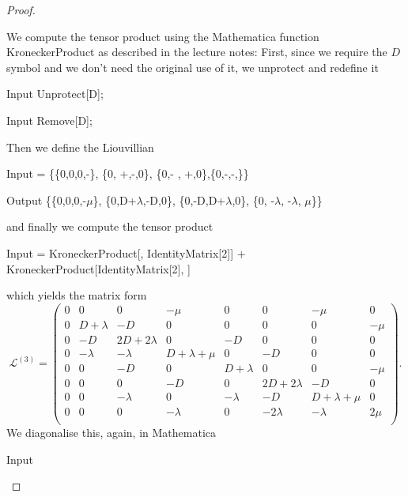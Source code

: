\begin{proof}
\begin{parts}
	We compute the tensor product using the Mathematica function KroneckerProduct as described in the lecture notes: First, since we require the $D$ symbol and we don't need the original use of it, we unprotect and redefine it
	\begin{mmaCell}{Input}
		Unprotect[D];
	\end{mmaCell}
	\begin{mmaCell}{Input}
		Remove[D];
	\end{mmaCell}
	Then we define the Liouvillian
\begin{mmaCell}[functionlocal=y]{Input}
	 = \{\{0,0,0,-\mmaUnd{\(\pmb{\mu}\)}\}, \{0, +\mmaUnd{\(\pmb{\lambda}\)},-,0\}, \{0,- , +\mmaUnd{\(\pmb{\lambda}\)},0\},\{0,-\mmaUnd{\(\pmb{\lambda}\)},-\mmaUnd{\(\pmb{\lambda}\)},\mmaUnd{\(\pmb{\mu}\)}\}\} 
\end{mmaCell}
\begin{mmaCell}{Output}
	\{\{0,0,0,-\(\mu\)\}, \{0,D+\(\lambda\),-D,0\}, \{0,-D,D+\(\lambda\),0\}, \{0, -\(\lambda\), -\(\lambda\), \(\mu\)\}\}
\end{mmaCell}
and finally we compute the tensor product
\begin{mmaCell}[moredefined=KroneckerProduct]{Input}
	 = KroneckerProduct[, IdentityMatrix[2]] +  KroneckerProduct[IdentityMatrix[2], ] 
\end{mmaCell}
which yields the matrix form
\[
	\mathcal{L}^{(3)} =\left(
\begin{array}{cccccccc}
 0 & 0 & 0 & -\mu  & 0 & 0 & -\mu  & 0 \\
 0 & D+\lambda  & -D & 0 & 0 & 0 & 0 & -\mu  \\
 0 & -D & 2 D+2 \lambda  & 0 & -D & 0 & 0 & 0 \\
 0 & -\lambda  & -\lambda  & D+\lambda +\mu  & 0 & -D & 0 & 0 \\
 0 & 0 & -D & 0 & D+\lambda  & 0 & 0 & -\mu  \\
 0 & 0 & 0 & -D & 0 & 2 D+2 \lambda  & -D & 0 \\
 0 & 0 & -\lambda  & 0 & -\lambda  & -D & D+\lambda +\mu  & 0 \\
 0 & 0 & 0 & -\lambda  & 0 & -2 \lambda  & -\lambda  & 2 \mu  \\
\end{array}
\right) 
.\] 
We diagonalise this, again, in Mathematica
\begin{mmaCell}{Input}

\end{mmaCell}
\end{parts}
\end{proof}

